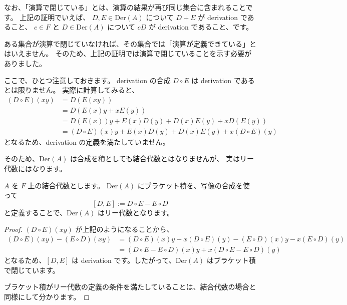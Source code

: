 \documentclass{ltjsarticle}
\begin{document}
なお、「演算で閉じている」とは、演算の結果が再び同じ集合に含まれることです。
上記の証明でいえば、
\(D, E \in \mathrm{Der}(A)\) について \(D + E\) が derivation であること、
\(c \in F\) と \(D \in \mathrm{Der}(A)\) について \(cD\) が derivation であること、です。

ある集合が演算で閉じていなければ、その集合では「演算が定義できている」とはいえません。
そのため、上記の証明では演算で閉じていることを示す必要がありました。

ここで、ひとつ注意しておきます。
derivation の合成 \(D \circ E\) は derivation であるとは限りません。
実際に計算してみると、
\begin{align*}
    (D \circ E)(xy) & = D(E(xy))                                                \\
                    & = D(E(x)y + xE(y))                                        \\
                    & = D(E(x))y + E(x)D(y) + D(x)E(y) + xD(E(y))               \\
                    & = (D \circ E)(x)y + E(x)D(y) + D(x)E(y) + x(D \circ E)(y)
\end{align*}
となるため、derivation の定義を満たしていません。

そのため、\(\mathrm{Der}(A)\) は合成を積としても結合代数とはなりませんが、
実はリー代数にはなります。

\begin{example}
    \(A\) を \(F\) 上の結合代数とします。
    \(\mathrm{Der}(A)\) にブラケット積を、写像の合成を使って
    \[
        [D, E] := D \circ E - E \circ D
    \]
    と定義することで、\(\mathrm{Der}(A)\) はリー代数となります。
\end{example}

\begin{proof}
    \((D \circ E)(xy)\) が上記のようになることから、
    \begin{align*}
        (D \circ E)(xy) - (E \circ D)(xy) & = (D \circ E)(x)y + x(D \circ E)(y) - (E \circ D)(x)y - x(E \circ D)(y) \\
                                          & = (D \circ E - E \circ D)(x)y + x(D \circ E - E \circ D)(y)
    \end{align*}
    となるため、\([D, E]\) は derivation です。したがって、\(\mathrm{Der}(A)\) はブラケット積で閉じています。

    ブラケット積がリー代数の定義の条件を満たしていることは、結合代数の場合と同様にして分かります。
\end{proof}
\end{document}
